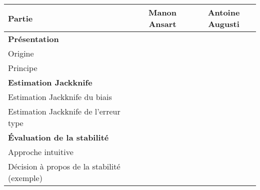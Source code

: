 \documentclass[a4paper,10pt]{article}
\newcommand{\hlineGras}{\Xhline{2\arrayrulewidth}}
\begin{document}
	\vspace{10px}
	\begin{center}
		\begin{tabular}
		{| l || c | c |} \hline
		Partie & Manon Ansart & Antoine Augusti \\ \hline \hline
		\textbf{Présentation} & & \\ \hline
		Origine & \checkmark & \checkmark \\ \hline
		Principe & \checkmark & \checkmark \\ \hline
		\hlineGras
		\textbf{Estimation Jackknife} & & \\ \hline
		Estimation Jackknife du biais  & & \checkmark  \\ \hline
		Estimation Jackknife de l'erreur type & \checkmark &  \\ \hline
		\hlineGras
		\textbf{Évaluation de la stabilité} & & \\ \hline
		Approche intuitive  & & \checkmark \\ \hline
		Décision à propos de la stabilité (exemple)  & & \checkmark \\ \hline
		\end{tabular}
	\end{center}
\end{document}
